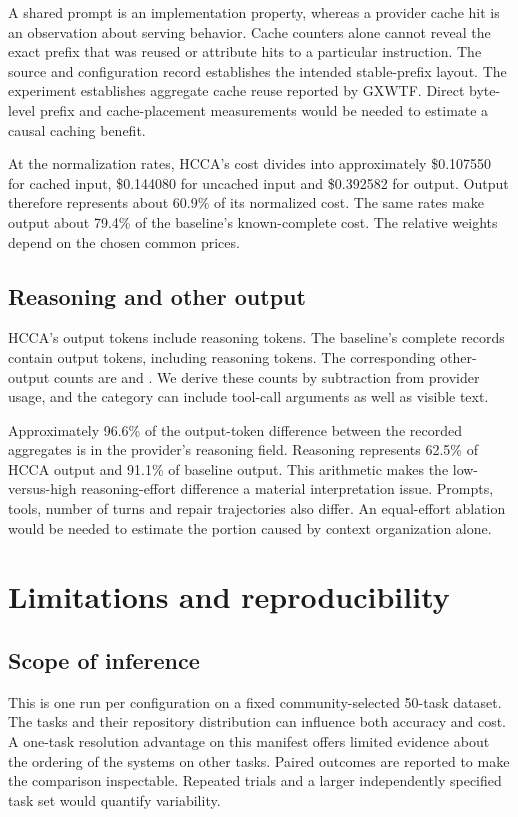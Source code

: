 \documentclass[10pt,a4paper]{article}
\begin{document}
A shared prompt is an implementation property, whereas a provider cache hit
is an observation about serving behavior. Cache counters alone cannot reveal
the exact prefix that was reused or attribute hits to a particular instruction.
The source and configuration record establishes the intended stable-prefix
layout. The experiment establishes aggregate cache reuse reported by GXWTF.
Direct byte-level prefix and cache-placement measurements would be needed to
estimate a causal caching benefit.

At the normalization rates, HCCA's cost divides into approximately
\$0.107550 for cached input, \$0.144080 for uncached input and \$0.392582 for
output. Output therefore represents about 60.9\% of its normalized cost. The
same rates make output about 79.4\% of the baseline's known-complete cost.
The relative weights depend on the chosen common prices.

\subsection{Reasoning and other output}

HCCA's \HOutput{} output tokens include \HReasoning{} reasoning tokens.
The baseline's complete records contain \BOutput{} output tokens, including
\BReasoning{} reasoning tokens. The corresponding other-output counts are
\HOtherOutput{} and \BOtherOutput{}. We derive these counts by subtraction
from provider usage, and the category can include tool-call arguments as well
as visible text.

Approximately 96.6\% of the output-token difference between the recorded
aggregates is in the provider's reasoning field. Reasoning represents 62.5\%
of HCCA output and 91.1\% of baseline output. This arithmetic makes the
low-versus-high reasoning-effort difference a material interpretation issue.
Prompts, tools, number of turns and repair trajectories also differ. An
equal-effort ablation would be needed to estimate the portion caused by context
organization alone.

\section{Limitations and reproducibility}

\subsection{Scope of inference}

This is one run per configuration on a fixed community-selected 50-task
dataset. The tasks and their repository distribution can influence both
accuracy and cost. A one-task resolution advantage on this manifest offers
limited evidence about the ordering of the systems on other tasks. Paired
outcomes are reported to make the comparison inspectable. Repeated trials and
a larger independently specified task set would quantify variability.
\end{document}
